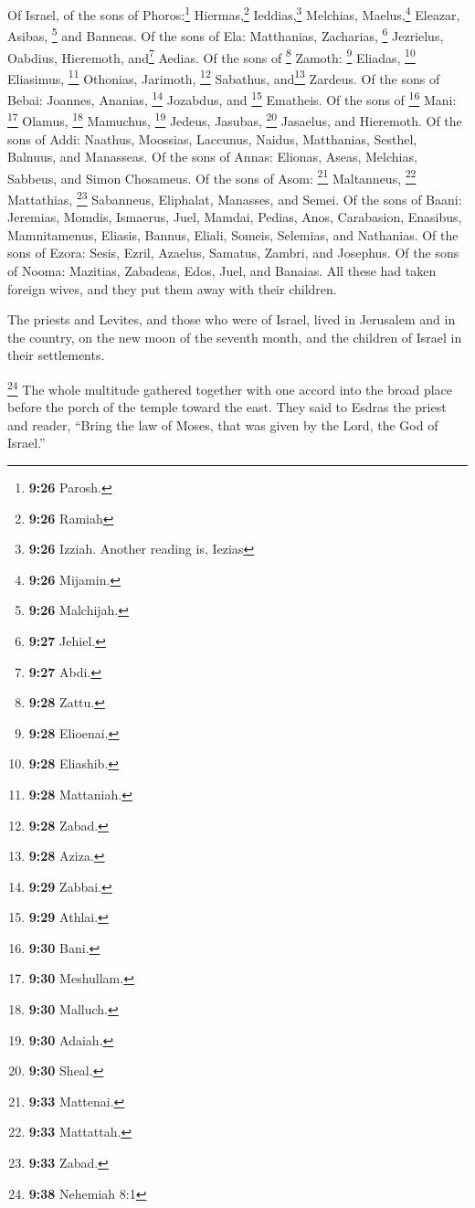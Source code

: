  Of Israel, of the sons of Phoros:\footnote{\textbf{9:26}
  Parosh.} Hiermas,\footnote{\textbf{9:26} Ramiah} Ieddias,\footnote{\textbf{9:26}
  Izziah. Another reading is, Iezias} Melchias, Maelus,\footnote{\textbf{9:26}
  Mijamin.} Eleazar, Asibas, \footnote{\textbf{9:26} Malchijah.} and
Banneas.  Of the sons of Ela: Matthanias, Zacharias,
\footnote{\textbf{9:27} Jehiel.} Jezrielus, Oabdius, Hieremoth,
and\footnote{\textbf{9:27} Abdi.} Aedias.  Of the sons of
\footnote{\textbf{9:28} Zattu.} Zamoth: \footnote{\textbf{9:28}
  Elioenai.} Eliadas, \footnote{\textbf{9:28} Eliashib.} Eliasimus,
\footnote{\textbf{9:28} Mattaniah.} Othonias, Jarimoth, \footnote{\textbf{9:28}
  Zabad.} Sabathus, and\footnote{\textbf{9:28} Aziza.} Zardeus.
 Of the sons of Bebai: Joannes, Ananias, \footnote{\textbf{9:29}
  Zabbai.} Jozabdus, and \footnote{\textbf{9:29} Athlai.} Ematheis.
 Of the sons of \footnote{\textbf{9:30} Bani.} Mani:
\footnote{\textbf{9:30} Meshullam.} Olamus, \footnote{\textbf{9:30}
  Malluch.} Mamuchus, \footnote{\textbf{9:30} Adaiah.} Jedeus, Jasubas,
\footnote{\textbf{9:30} Sheal.} Jasaelus, and Hieremoth. 
Of the sons of Addi: Naathus, Moossias, Laccunus, Naidus, Matthanias,
Sesthel, Balnuus, and Manasseas.  Of the sons of Annas:
Elionas, Aseas, Melchias, Sabbeus, and Simon Chosameus. 
Of the sons of Asom: \footnote{\textbf{9:33} Mattenai.} Maltanneus,
\footnote{\textbf{9:33} Mattattah.} Mattathias, \footnote{\textbf{9:33}
  Zabad.} Sabanneus, Eliphalat, Manasses, and Semei.  Of
the sons of Baani: Jeremias, Momdis, Ismaerus, Juel, Mamdai, Pedias,
Anos, Carabasion, Enasibus, Mamnitamenus, Eliasis, Bannus, Eliali,
Someis, Selemias, and Nathanias. Of the sons of Ezora: Sesis, Ezril,
Azaelus, Samatus, Zambri, and Josephus.  Of the sons of
Nooma: Mazitias, Zabadeas, Edos, Juel, and Banaias.  All
these had taken foreign wives, and they put them away with their
children.

 The priests and Levites, and those who were of Israel,
lived in Jerusalem and in the country, on the new moon of the seventh
month, and the children of Israel in their settlements.

 \footnote{\textbf{9:38} Nehemiah 8:1} The whole
multitude gathered together with one accord into the broad place before
the porch of the temple toward the east.  They said to
Esdras the priest and reader, ``Bring the law of Moses, that was given
by the Lord, the God of Israel.''

